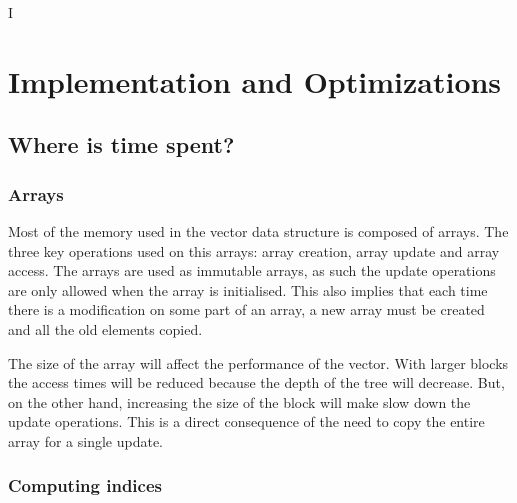 I%

\chapter{Implementation and Optimizations} %

\label{Implementation} %



\section{Where is time spent?}


\subsection{Arrays}
Most of the memory used in the vector data structure is composed of arrays. The three key operations used on this arrays: array creation, array update and array access. The arrays are used as immutable arrays, as such the update operations are only allowed when the array is initialised. This also implies that each time there is a modification on some part of an array, a new array must be created and all the old elements copied. 

The size of the array will affect the performance of the vector. With larger blocks the access times will be reduced because the depth of the tree will decrease. But, on the other hand, increasing the size of the block will make slow down the update operations. This is a direct consequence of the need to copy the entire array for a single update.



\subsection{Computing indices}

